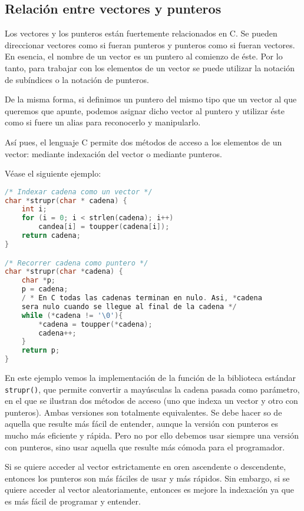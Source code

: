 \subsection{Relación entre vectores y punteros}{
Los vectores y los punteros están fuertemente relacionados en C. Se pueden direccionar vectores como si fueran punteros y punteros como si fueran vectores. En esencia, el nombre de un vector es un puntero al comienzo de éste. Por lo tanto, para trabajar con los elementos de un vector se puede utilizar la notación de subíndices o la notación de punteros.

De la misma forma, si definimos un puntero del mismo tipo que un vector al que queremos que apunte, podemos asignar dicho vector al puntero y utilizar éste como si fuere un alias para reconocerlo y manipularlo.

Así pues, el lenguaje C permite dos métodos de acceso a los elementos de un vector: mediante indexación del vector o mediante punteros.

Véase el siguiente ejemplo:
\begin{Ejemplo}
\begin{lstlisting}[language=C]
/* Indexar cadena como un vector */
char *strupr(char * cadena) {
    int i;
    for (i = 0; i < strlen(cadena); i++)
        candea[i] = toupper(cadena[i]);
    return cadena;
}

/* Recorrer cadena como puntero */
char *strupr(char *cadena) {
    char *p;
    p = cadena;
    / * En C todas las cadenas terminan en nulo. Asi, *cadena
    sera nulo cuando se llegue al final de la cadena */
    while (*cadena != '\0'){
        *cadena = toupper(*cadena);
        cadena++;
    }
    return p;
}
\end{lstlisting}
\Explicacion
En este ejemplo vemos la implementación de la función de la biblioteca estándar \texttt{strupr()}, que permite convertir a mayúsculas la cadena pasada como parámetro, en el que se ilustran dos métodos de acceso (uno que indexa un vector y otro con punteros). Ambas versiones son totalmente equivalentes. Se debe hacer so de aquella que resulte más fácil de entender, aunque la versión con punteros es mucho más eficiente y rápida. Pero no por ello debemos usar siempre una versión con punteros, sino usar aquella que resulte más cómoda para el programador.

Si se quiere acceder al vector estrictamente en oren ascendente o descendente, entonces los punteros son más fáciles de usar y más rápidos. Sin embargo, si se quiere acceder al vector aleatoriamente, entonces es mejore la indexación ya que es más fácil de programar y entender.
\end{Ejemplo}
}

